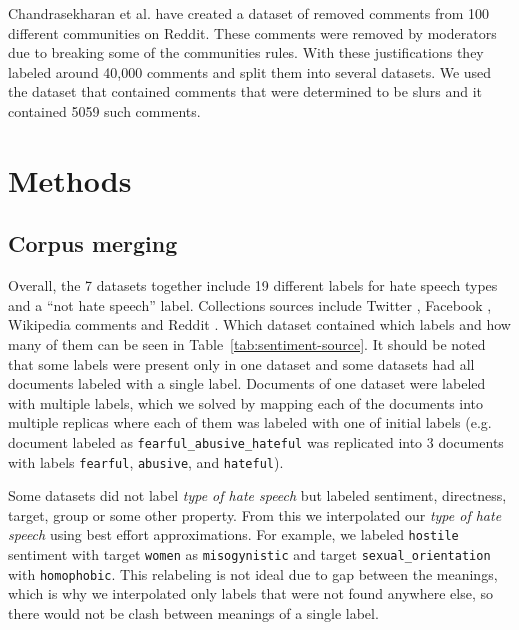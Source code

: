 \documentclass[fleqn,moreauthors,10pt]{ds_report}
\begin{document}
Chandrasekharan et al. \cite{zenodo} have created a dataset of removed comments from 100 different communities on Reddit. These comments were removed by moderators due to breaking some of the communities rules. With these justifications they labeled around 40,000 comments and split them into several datasets. We used the dataset that contained comments that were determined to be slurs and it contained 5059 such comments.


\section*{Methods}

\subsection*{Corpus merging}

Overall, the 7 datasets together include 19 different labels for hate speech types and a ``not hate speech'' label. Collections sources include Twitter \cite{20_twitter, 32_twitter, vulgar-twitter, 25_twitter}, Facebook \cite{16_facebook}, Wikipedia comments \cite{kaggle-jigsaw} and Reddit \cite{zenodo}. Which dataset contained which labels and how many of them can be seen in Table~\ref{tab:sentiment-source}.
It should be noted that some labels were present only in one dataset and some datasets had all documents labeled with a single label. Documents of one dataset were labeled with multiple labels, which we solved by mapping each of the documents into multiple replicas where each of them was labeled with one of initial labels (e.g. document labeled as \texttt{fearful\_abusive\_hateful} was replicated into 3 documents with labels \texttt{fearful}, \texttt{abusive}, and \texttt{hateful}).

Some datasets did not label \textit{type of hate speech} but labeled sentiment, directness, target, group or some other property. From this we interpolated our \textit{type of hate speech} using best effort approximations. For example, we labeled \texttt{hostile} sentiment with target \texttt{women} as \texttt{misogynistic} and target \texttt{sexual\_orientation} with \texttt{homophobic}. This relabeling is not ideal due to gap between the meanings, which is why we interpolated only labels that were not found anywhere else, so there would not be clash between meanings of a single label.
\end{document}
